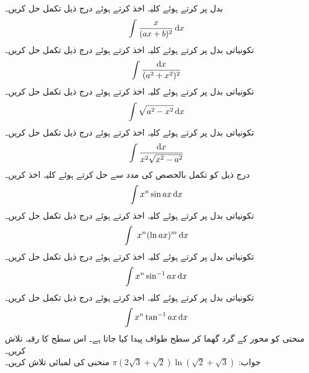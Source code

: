 بدل  پر کرتے ہوئے کلیہ  اخذ کرتے ہوئے درج ذیل تکمل حل کریں۔
\begin{align*}
\int\frac{x}{(ax+b)^2}\dif x
\end{align*}
تکونیاتی بدل پر کرتے ہوئے کلیہ  اخذ کرتے ہوئے درج ذیل تکمل حل کریں۔
\begin{align*}
\int\frac{\dif x}{(a^2+x^2)^2}
\end{align*}
تکونیاتی بدل  پر کرتے ہوئے کلیہ  اخذ کرتے ہوئے درج ذیل تکمل حل کریں۔
\begin{align*}
\int\sqrt{a^2-x^2}\dif x
\end{align*}
تکونیاتی بدل  پر کرتے ہوئے کلیہ  اخذ کرتے ہوئے درج ذیل تکمل حل کریں۔
\begin{align*}
\int\frac{\dif x}{x^2\sqrt{x^2-a^2}}
\end{align*}
درج ذیل کو تکمل بالحصص کی مدد سے حل کرتے ہوئے کلیہ  اخذ کریں۔
\begin{align*}
\int x^n \sin ax \dif x
\end{align*}
تکونیاتی بدل  پر کرتے ہوئے کلیہ  اخذ کرتے ہوئے درج ذیل تکمل حل کریں۔
\begin{align*}
\int\ x^n (\ln ax)^m\dif x
\end{align*}
تکونیاتی بدل  پر کرتے ہوئے کلیہ  اخذ کرتے ہوئے درج ذیل تکمل حل کریں۔
\begin{align*}
\int x^n\sin^{-1}ax\dif x
\end{align*}
تکونیاتی بدل  پر کرتے ہوئے کلیہ  اخذ کرتے ہوئے درج ذیل تکمل حل کریں۔
\begin{align*}
\int x^n\tan^{-1} ax\dif x
\end{align*}
منحنی  کو محور  کے گرد گھما کر سطح طواف پیدا کیا جاتا ہے۔ اس سطح کا رقبہ تلاش کریں۔\\
جواب:\quad
$\pi(2\sqrt{3}+\sqrt{2})\ln(\sqrt{2}+\sqrt{3})$
منحنی  کی لمبائی تلاش کریں۔
